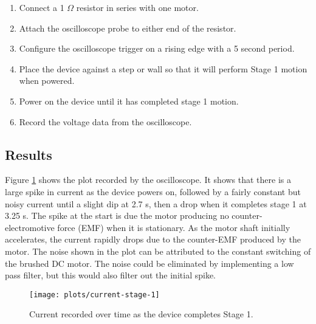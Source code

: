 \begin{enumerate}
	\item Connect a 1 $\Omega$ resistor in series with one motor.
	\item Attach the oscilloscope probe to either end of the resistor.
	\item Configure the oscilloscope trigger on a rising edge with a 5 second period.
	\item Place the device against a step or wall so that it will perform Stage 1 motion when powered.
	\item Power on the device until it has completed stage 1 motion.
	\item Record the voltage data from the oscilloscope.
\end{enumerate}

\subsection{Results}

Figure \ref{fig:current-stage-1} shows the plot recorded by the oscilloscope. It shows that there is a large spike in current as the device powers on, followed by a fairly constant but noisy current until a slight dip at 2.7 s, then a drop when it completes stage 1 at 3.25 s. The spike at the start is due the motor producing no counter-electromotive force (EMF) when it is stationary. As the motor shaft initially accelerates, the current rapidly drops due to the counter-EMF produced by the motor. The noise shown in the plot can be attributed to the constant switching of the brushed DC motor. The noise could be eliminated by implementing a low pass filter, but this would also filter out the initial spike. 
\begin{figure}[h]
	\centering
	\texttt{[image: plots/current-stage-1]}
	\caption{Current recorded over time as the device completes Stage 1.}
	\label{fig:current-stage-1}
\end{figure}